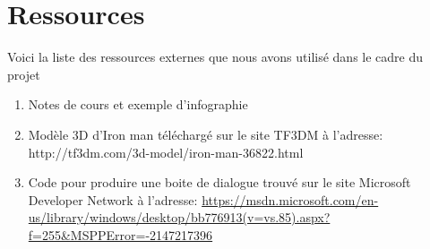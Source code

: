 \usepackage{url}

\chapter{Ressources}
\label{s:ressources}

Voici la liste des ressources externes que nous avons utilisé dans le cadre du projet
\begin{enumerate}
	\item Notes de cours et exemple d'infographie 
	\item Modèle 3D d'Iron man téléchargé sur le site TF3DM à l'adresse: http://tf3dm.com/3d-model/iron-man-36822.html
	\item Code pour produire une boite de dialogue trouvé sur le site Microsoft Developer Network à l'adresse: \url{https://msdn.microsoft.com/en-us/library/windows/desktop/bb776913(v=vs.85).aspx?f=255&MSPPError=-2147217396}
\end{enumerate}